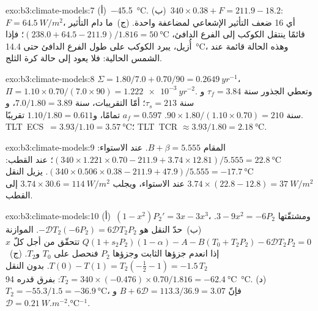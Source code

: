 \begin{solution}{exo:b3:climate-models:7}
(أ)~\qty{-45.5}{\celsius}. (ب)~$340\times0.38 + F = 211.9 - 18.2$: $F =
\qty{64.5}{W/m^2}$، أي 16 ضعف التأثير الإشعاعي لمضاعفة واحدة. (ج)~ما دام
التأثير قائمًا ينتقل الكوكب إلى الفرع الدافئ، $(238.0 + 64.5 -
211.9)/1.816 = \qty{50}{\celsius}$؛ فإذا أُزيل، يبرد الكوكب
على طول الفرع الدافئ حتى \qty{14.4}{\celsius}، وهذه الحالة قائمة عند الشمس الحالية:
فلا يعود إلى حالة كرة الثلج.
\end{solution}

\begin{solution}{exo:b3:climate-models:8}
$\Sigma = 1.80/7.0 + 0.70/90 = \qty{0.2649}{yr^{-1}}$، $\Pi = 1.10\times0.70/
(7.0\times90) = \qty{1.222e-3}{yr^{-2}}$. وتعطي الجذور $\tau_f =
\num{3.84}\text{ سنة}$ و$\tau_s = \num{213}\text{ سنة}$؛ أمّا التقريبات،
$7.0/1.80 = \num{3.89}\text{ سنة}$، و$90\times1.80/(1.10\times0.70) =
\num{210}\text{ سنة}$. $a_f = 0.597$ تمامًا، و$1.10/1.80 = 0.611$
تقريبًا. \mbox{\textdir TLT ECS $= 3.93/1.10 = \qty{3.57}{\celsius}$}؛ \mbox{\textdir TLT TCR} $\approx
3.93/1.80 = \qty{2.18}{\celsius}$.
\end{solution}

\begin{solution}{exo:b3:climate-models:9}
المقام $B + \beta = \num{5.555}$. عند الاستواء: $(340\times1.221\times0.70 -
211.9 + 3.74\times12.81)/5.555 = \qty{22.8}{\celsius}$؛ عند القطب:
$(340\times0.506\times0.38 - 211.9 + 47.9)/5.555 = \qty{-17.7}{\celsius}$.
يزيل النقل $3.74\times(22.8 - 12.8) = \qty{37}{W/m^2}$ عند
الاستواء، ويجلب $3.74\times30.6 = \qty{114}{W/m^2}$ إلى القطب.
\end{solution}

\begin{solution}{exo:b3:climate-models:10}
(أ)~$(1 - x^2)P_2' = 3x - 3x^3$، ومشتقّتها $3 - 9x^2 = -6P_2$.
(ب)~حدّ النقل هو $-\mathcal D T_2(-6P_2) = 6\mathcal DT_2P_2$.
الموازنة $Q(1 + s_2P_2)(1 - \alpha) - A - B(T_0 + T_2P_2) - 6\mathcal
DT_2P_2 = 0$ تتحقّق من أجل كلّ $x$ إذا انعدم جزؤها الثابت وجزؤها $P_2$
فنحصل على $T_0$ و$T_2$. (ج)~$T(0) - T(1) = T_2(-\tfrac12 - 1)
= -1.5\,T_2$. بدون النقل $T_2 = 340\times(-0.476)\times0.70/1.816 =
\qty{-62.4}{\celsius}$: بفرق قدره \qty{94}{\celsius}. (د)~$T_2 =
-55.3/1.5 = \qty{-36.9}{\celsius}$، فإنّ $B + 6\mathcal D = 113.3/36.9 =
3.07$ و$\mathcal D = \qty{0.21}{W.m^{-2}.\celsius^{-1}}$.
\end{solution}

